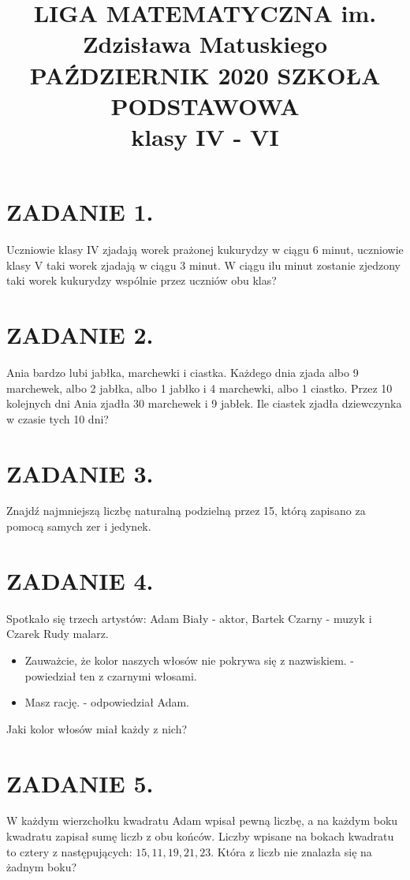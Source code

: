 \documentclass[10pt]{article}
\title{LIGA MATEMATYCZNA im. Zdzisława Matuskiego PAŹDZIERNIK 2020 SZKOŁA PODSTAWOWA \\
 klasy IV - VI }
\author{}
\date{}
\begin{document}
\maketitle
\section*{ZADANIE 1.}
Uczniowie klasy IV zjadają worek prażonej kukurydzy w ciągu 6 minut, uczniowie klasy V taki worek zjadają w ciągu 3 minut. W ciągu ilu minut zostanie zjedzony taki worek kukurydzy wspólnie przez uczniów obu klas?

\section*{ZADANIE 2.}
Ania bardzo lubi jabłka, marchewki i ciastka. Każdego dnia zjada albo 9 marchewek, albo 2 jabłka, albo 1 jabłko i 4 marchewki, albo 1 ciastko. Przez 10 kolejnych dni Ania zjadła 30 marchewek i 9 jabłek. Ile ciastek zjadła dziewczynka w czasie tych 10 dni?

\section*{ZADANIE 3.}
Znajdź najmniejszą liczbę naturalną podzielną przez 15, którą zapisano za pomocą samych zer i jedynek.

\section*{ZADANIE 4.}
Spotkało się trzech artystów: Adam Biały - aktor, Bartek Czarny - muzyk i Czarek Rudy malarz.

\begin{itemize}
  \item Zauważcie, że kolor naszych włosów nie pokrywa się z nazwiskiem. - powiedział ten z czarnymi włosami.
  \item Masz rację. - odpowiedział Adam.
\end{itemize}

Jaki kolor włosów miał każdy z nich?

\section*{ZADANIE 5.}
W każdym wierzchołku kwadratu Adam wpisał pewną liczbę, a na każdym boku kwadratu zapisał sumę liczb z obu końców. Liczby wpisane na bokach kwadratu to cztery z następujących: \(15,11,19,21,23\). Która z liczb nie znalazła się na żadnym boku?
\end{document}
